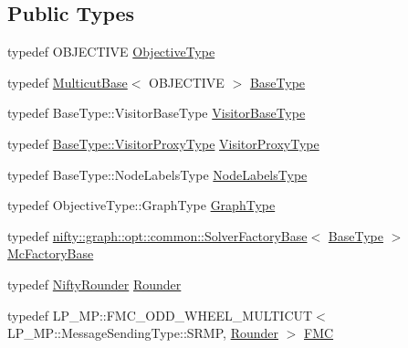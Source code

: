 \subsection*{Public Types}
\begin{DoxyCompactItemize}
\item 
typedef O\+B\+J\+E\+C\+T\+I\+VE \hyperlink{classnifty_1_1graph_1_1opt_1_1multicut_1_1MulticutMp_a9fefe9d9756a1eef71329656d2fdf9f4}{Objective\+Type}
\item 
typedef \hyperlink{classnifty_1_1graph_1_1opt_1_1multicut_1_1MulticutBase}{Multicut\+Base}$<$ O\+B\+J\+E\+C\+T\+I\+VE $>$ \hyperlink{classnifty_1_1graph_1_1opt_1_1multicut_1_1MulticutMp_a1d31948dfabbb3c5a3f3523dd9ba23e7}{Base\+Type}
\item 
typedef Base\+Type\+::\+Visitor\+Base\+Type \hyperlink{classnifty_1_1graph_1_1opt_1_1multicut_1_1MulticutMp_af8d6587bb26bf816e5900ec4831f32b9}{Visitor\+Base\+Type}
\item 
typedef \hyperlink{classnifty_1_1graph_1_1opt_1_1common_1_1SolverBase_ad209b469b3bc9fc0fc14e9fed4d09075}{Base\+Type\+::\+Visitor\+Proxy\+Type} \hyperlink{classnifty_1_1graph_1_1opt_1_1multicut_1_1MulticutMp_a258c19dc77022888eb69098c8d883622}{Visitor\+Proxy\+Type}
\item 
typedef Base\+Type\+::\+Node\+Labels\+Type \hyperlink{classnifty_1_1graph_1_1opt_1_1multicut_1_1MulticutMp_a7afb88ab31185de5cef8a3d98022c0a2}{Node\+Labels\+Type}
\item 
typedef Objective\+Type\+::\+Graph\+Type \hyperlink{classnifty_1_1graph_1_1opt_1_1multicut_1_1MulticutMp_afe2d51eadb083a9b4546cd08fb7340e9}{Graph\+Type}
\item 
typedef \hyperlink{classnifty_1_1graph_1_1opt_1_1common_1_1SolverFactoryBase}{nifty\+::graph\+::opt\+::common\+::\+Solver\+Factory\+Base}$<$ \hyperlink{classnifty_1_1graph_1_1opt_1_1multicut_1_1MulticutMp_a1d31948dfabbb3c5a3f3523dd9ba23e7}{Base\+Type} $>$ \hyperlink{classnifty_1_1graph_1_1opt_1_1multicut_1_1MulticutMp_ab1974bc35fb66895a3a7bfc820f9b78d}{Mc\+Factory\+Base}
\item 
typedef \hyperlink{structnifty_1_1graph_1_1opt_1_1multicut_1_1MulticutMp_1_1NiftyRounder}{Nifty\+Rounder} \hyperlink{classnifty_1_1graph_1_1opt_1_1multicut_1_1MulticutMp_a797fe1696d6c09f66835e7899cf3c9fb}{Rounder}
\item 
typedef L\+P\+\_\+\+M\+P\+::\+F\+M\+C\+\_\+\+O\+D\+D\+\_\+\+W\+H\+E\+E\+L\+\_\+\+M\+U\+L\+T\+I\+C\+UT$<$ L\+P\+\_\+\+M\+P\+::\+Message\+Sending\+Type\+::\+S\+R\+MP, \hyperlink{classnifty_1_1graph_1_1opt_1_1multicut_1_1MulticutMp_a797fe1696d6c09f66835e7899cf3c9fb}{Rounder} $>$ \hyperlink{classnifty_1_1graph_1_1opt_1_1multicut_1_1MulticutMp_a3612b09afe1b53b4a070428a6d565ae4}{F\+MC}

\end{DoxyCompactItemize}
